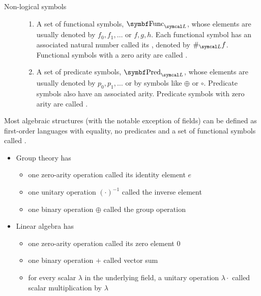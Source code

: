 \begin{definition}
\begin{description}
    \item[Non-logical symbols]
    \mbox{}
    \begin{enumerate}
      \item A set of functional symbols, \( \Bold{Func}_{\Cal{L}} \), whose elements are usually denoted by \( f_0, f_1, \ldots \) or \( f, g, h \). Each functional symbol has an associated natural number called its , denoted by \( \#_{\Cal{L}} f \). Functional symbols with a zero arity are called .

      \item A set of predicate symbols, \( \Bold{Pred}_{\Cal{L}} \), whose elements are usually denoted by \( p_0, p_1, \ldots \) or by symbols like \( \oplus \) or \( \circ \). Predicate symbols also have an associated arity. Predicate symbols with zero arity are called .
    \end{enumerate}
  \end{description}
\end{definition}

\begin{example}\label{ex:algebraic_theory_language}\cite[remark 2.1.4]{Leinster2014}
  Most algebraic structures (with the notable exception of fields) can be defined as first-order languages with equality, no predicates and a set of functional symbols called .
  \begin{itemize}
    \item Group theory has
    \begin{itemize}
      \item one zero-arity operation called its identity element \( e \)
      \item one unitary operation \( (\cdot)^{-1} \) called the inverse element
      \item one binary operation \( \oplus \) called the group operation
    \end{itemize}

    \item Linear algebra has
    \begin{itemize}
      \item one zero-arity operation called its zero element \( 0 \)
      \item one binary operation \( + \) called vector sum
      \item for every scalar \( \lambda \) in the underlying field, a unitary operation \( \lambda \cdot \) called scalar multiplication by \( \lambda \)
    \end{itemize}
  \end{itemize}
\end{example}

